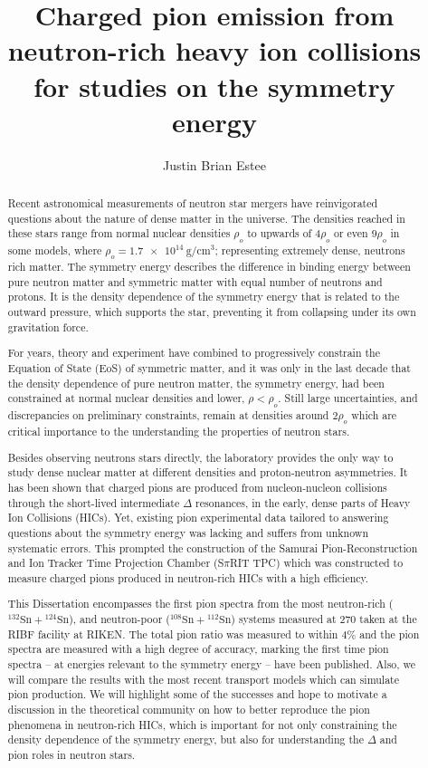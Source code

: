 \documentclass{altmsuphddissertation}
\author{Justin Brian Estee} %
\title{Charged pion emission from neutron-rich heavy ion collisions for studies on the symmetry energy} %
\newcommand{\spirit}{S$\pi$RIT }
\newcommand{\tin}[2]{{}^{#1}\mathrm{Sn} + {}^{#2}\mathrm{Sn}}
\begin{document}
\frontmatter
\maketitlepage %
\begin{abstract}

Recent astronomical measurements of neutron star mergers have reinvigorated questions about the nature of dense matter in the universe. The densities reached in these stars range from normal nuclear densities $\rho_o$ to upwards of $4\rho_o$ or even $9\rho_o$ in some models, where $\rho_o = \SI{1.7e14}{\gram\per\centi\metre\cubed}$; representing extremely dense, neutrons rich matter. The symmetry energy describes the difference in binding energy between pure neutron matter and symmetric matter with equal number of neutrons and protons. It is the density dependence of the symmetry energy that is related to the outward pressure, which supports the star, preventing it from collapsing under its own gravitation force.

 For years, theory and experiment  have combined to progressively constrain the Equation of State (EoS) of symmetric matter, and it was only in the last decade that the density dependence of pure neutron matter, the symmetry energy, had been constrained at normal nuclear densities and lower, $\rho < \rho_o$. Still large uncertainties, and discrepancies on preliminary constraints, remain at densities around 2$\rho_o$ which are critical importance to the understanding the properties of neutron stars.

Besides observing neutrons stars directly, the laboratory provides the only way to study dense nuclear matter at different densities and proton-neutron asymmetries. It has been shown that charged pions are produced from nucleon-nucleon collisions through the short-lived intermediate $\Delta$ resonances, in the early, dense parts of Heavy Ion Collisions (HICs). Yet, existing pion experimental data tailored to answering questions about the symmetry energy was lacking and suffers from unknown systematic errors. This prompted the construction of the Samurai Pion-Reconstruction and Ion Tracker Time Projection Chamber (\spirit TPC) which was constructed to measure charged pions produced in neutron-rich HICs with a high efficiency. 

This Dissertation encompasses the first pion spectra from the most neutron-rich ($\tin{132}{124}$), and neutron-poor ($\tin{108}{112}$) systems measured at \SI{270}{\MeVA} taken at the RIBF facility at RIKEN. The total pion ratio was measured to within 4\% and the pion spectra are measured with a high degree of accuracy, marking the first time pion spectra  -- at energies relevant to the symmetry energy -- have been published.  Also, we will compare the results with the most recent transport models which can simulate pion production. We will highlight some of the successes and hope to motivate a discussion in the theoretical community on how to better reproduce the pion phenomena in neutron-rich HICs, which is important for not only constraining the density dependence of the symmetry energy, but also for understanding the $\Delta$ and pion roles in neutron stars. 
\end{abstract}
\end{document}
